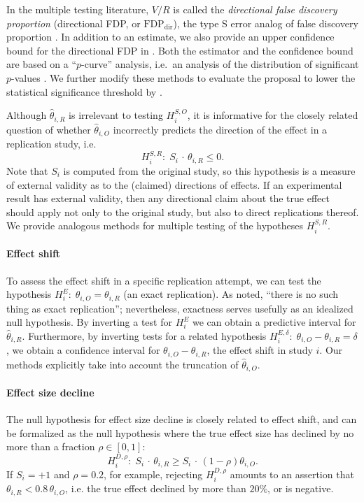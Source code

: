 \documentclass[11pt]{article}
\theoremstyle{definition}
\theoremstyle{custom}
\newcommand{\htheta}{\hat{\theta}}
\newcommand{\FDPd}{\text{FDP}_\text{dir}}
\begin{document}
  In the multiple testing literature, $V/R$ is called the {\em directional false discovery proportion} (directional FDP, or $\FDPd$), the type S error analog of false discovery proportion \citep[FDP;][]{Benjamini:2000ka}. In addition to an estimate, we also provide an upper confidence bound for the directional FDP in . Both the estimator and the confidence bound are based on a ``$p$-curve'' analysis, i.e.\ an analysis of the distribution of significant $p$-values \citep{Simonsohn:2014fa}. We further modify these methods to evaluate the proposal to lower the statistical significance threshold by \citet{Benjamin:2018gh}.

  Although $\htheta_{i,R}$ is irrelevant to testing $H_i^{S,O}$, it is informative for the closely related question of whether $\htheta_{i,O}$ incorrectly predicts the direction of the effect in a replication study, i.e.
  \[
    H_i^{S,R}:\; S_i \,\cdot\, \theta_{i,R} \le 0.
  \]
  Note that $S_i$ is computed from the original study, so this hypothesis is a measure of external validity as to the (claimed) directions of effects. If an experimental result has external validity, then any directional claim about the true effect should apply not only to the original study, but also to direct replications thereof. We provide analogous methods for multiple testing of the hypotheses $H_i^{S,R}$.

  \paragraph{Effect shift} To assess the effect shift in a specific replication attempt, we can test the hypothesis $H_i^E:\; \theta_{i,O} = \theta_{i,R}$ (an exact replication). As \citet{Anderson:2016gs} noted, ``there is no such thing as exact replication''; nevertheless, exactness serves usefully as an idealized null hypothesis. By inverting a test for $H_i^E$ we can obtain a predictive interval for $\htheta_{i,R}$. Furthermore, by inverting tests for a related hypothesis $H_i^{E,\delta}:\; \theta_{i,O} - \theta_{i,R} = \delta$, we obtain a confidence interval for $\theta_{i,O} - \theta_{i,R}$, the effect shift in study $i$. Our methods explicitly take into account the truncation of $\htheta_{i,O}$.

  \paragraph{Effect size decline} The null hypothesis for effect size decline is closely related to effect shift, and can be formalized as the null hypothesis where the true effect size has declined by no more than a fraction $\rho \in [0, 1]$:
  \[
    H_i^{D,\rho}:\; S_i \,\cdot\, \theta_{i,R} \ge S_i \,\cdot\, (1 - \rho) \theta_{i,O}.
  \]
  If $S_i = +1$ and $\rho=0.2$, for example, rejecting $H_i^{D,\rho}$ amounts to an assertion that $\theta_{i,R} < 0.8 \,\theta_{i,O}$, i.e. the true effect declined by more than $20\%$, or is negative.
\end{document}
